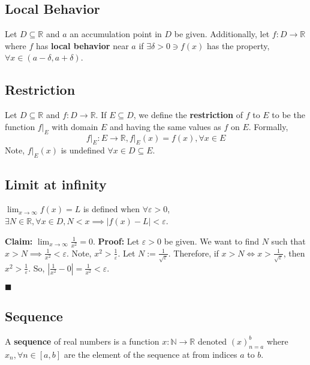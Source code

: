 \documentclass[11pt]{book}
\newcommand{\R}{\mathbb{R}}
\newcommand{\N}{\mathbb{N}}
\newcommand{\QED}{\begin{flushright}$\blacksquare$\end{flushright}}
\begin{document}
	\subsection{Local Behavior}
		\begin{defin}
			Let $D \subseteq \R$ and $a$ an accumulation point in $D$ be given. Additionally, let $f: D \to \R$ where $f$
			has \textbf{local behavior} near $a$ if $\exists \delta > 0 \ni f(x)$ has the property, $\forall x \in (a - \delta, a + \delta)$.
		\end{defin}
	\subsection{Restriction}
		\begin{defin}
			Let $D \subseteq \R$ and $f: D \to \R$. If $E \subseteq D$, we define the \textbf{restriction} of $f$ to $E$ to be the function $f\Big|_{E}$ with domain
			$E$ and having the same values as $f$ on $E$. Formally, $$f\Big|_E:E \to \R, f\Big|_E(x) = f(x), \forall x \in E$$
			Note, $f\Big|_E(x)$ is undefined $\forall x \in D\subseteq E$.
		\end{defin}
	\subsection{Limit at infinity}
		\begin{defin}
			$\displaystyle\lim_{x \to \infty}{f(x) = L}$ is defined when $\forall \varepsilon > 0$, $\exists N \in \R, \forall x \in D, N < x \implies |f(x) - L| <
			\varepsilon$.
		\end{defin}
		\begin{examp}
			\textbf{Claim:} $\displaystyle\lim_{x \to \infty}{\frac{1}{x^2} = 0}$.\hfill\break
			\textbf{Proof:} Let $\varepsilon > 0$ be given. We want to find $N$ such that $x > N \implies \frac{1}{x^2} < \varepsilon$. Note, $x^2 > \frac{1}{\varepsilon}$.
			Let $N := \frac{1}{\sqrt{\varepsilon}}$. Therefore, if $ x > N \Leftrightarrow x > \frac{1}{\sqrt{\varepsilon}}$, then $x^2 > \frac{1}{\varepsilon}$.
			So, $|\frac{1}{x^2} - 0| = \frac{1}{x^2} < \varepsilon$.
			\QED
		\end{examp}
	\subsection{Sequence}
		\begin{defin}
			A \textbf{sequence} of real numbers is a function $x:\N \to \R$ denoted $(x)_{n = a}^b$ where $x_n, \forall n \in [a,b]$ are the element of the 
			sequence at from indices $a$ to $b$.
		\end{defin}
\end{document}
